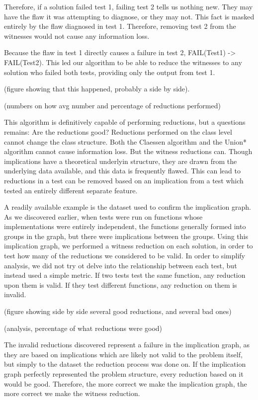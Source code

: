 \documentclass[11pt]{article}
\begin{document}
Therefore, if a solution failed test 1, failing test 2 tells us nothing new. They may have the flaw it was attempting to diagnose, or they may not. This fact is masked entirely by the flaw diagnosed in test 1. Therefore, removing test 2 from the witnesses would not cause any information loss.

Because the flaw in test 1 directly causes a failure in test 2, FAIL(Test1) -> FAIL(Test2). This led our algorithm to be able to reduce the witnesses to any solution who failed both tests, providing only the output from test 1.

(figure showing that this happened, probably a side by side).

(numbers on how avg number and percentage of reductions performed)

This algorithm is definitively  capable of performing reductions, but a questions remains: Are the reductions good? Reductions performed on the class level cannot change the class structure. Both the Claessen algorithm and the Union* algorithm cannot cause information loss. But the witness reductions can. Though implications have a theoretical underlyin structure, they are drawn from the underlying data available, and this data is frequently flawed. This can lead to reductions in a test can be removed based on an implication from a test which tested an entirely different separate feature.

A readily available example is the dataset used to confirm the implication graph. As we discovered earlier, when tests were run on functions whose implementations were entirely independent, the functions generally formed into groups in the  graph, but there were implications between the groups. Using this implication graph, we performed a witness reduction on each solution, in order to test how many of the reductions we considered to be valid. In order to simplify analysis, we did not try ot delve into the relationship between each test, but instead used a simple metric. If two tests test the same function, any reduction upon them is valid. If they test different  functions, any reduction on them is invalid.

(figure showing side by side several good reductions, and several bad ones)

(analysis, percentage of what reductions were good)

The invalid reductions discovered represent a failure in the implication graph, as they are based on implications which are likely not valid to the problem itself, but simply to the dataset the reduction process was done on. If the implication graph perfectly represented the problem structure, every reduction based on it would be good. Therefore, the more correct we make the implication graph, the more correct we make the witness reduction.
\end{document}
